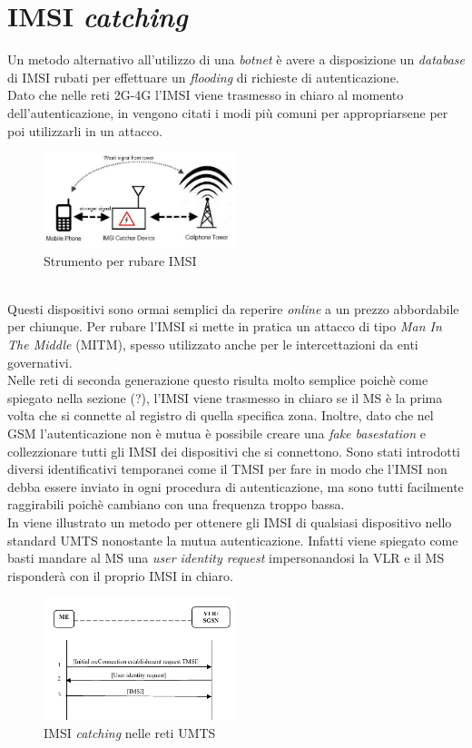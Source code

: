 \section{IMSI \textit{catching}}
Un metodo alternativo all'utilizzo di una \textit{botnet} è avere a disposizione un \textit{database} di IMSI rubati per effettuare un \textit{flooding} di richieste di autenticazione.\\
Dato che nelle reti 2G-4G l'IMSI viene trasmesso in chiaro al momento dell'autenticazione, in \cite{imsi-catcher} vengono citati i modi più comuni per appropriarsene per poi utilizzarli in un 
attacco.
\begin{figure}[h]
    \centering
    \includegraphics[width=0.5\textwidth]{images/imsi-catcher.jpg}
    \caption{Strumento per rubare IMSI}
\end{figure}\\
Questi dispositivi sono ormai semplici da reperire \textit{online} a un prezzo abbordabile per chiunque. Per rubare l'IMSI si mette in pratica un attacco di tipo \textit{Man In The Middle} (MITM), spesso utilizzato
anche per le intercettazioni da enti governativi.\\
Nelle reti di seconda generazione questo risulta molto semplice poichè come spiegato nella sezione (?), l'IMSI viene trasmesso in chiaro se il MS è la prima volta che si connette al registro di quella specifica
zona. Inoltre, dato che nel GSM l'autenticazione non è mutua è possibile creare una \textit{fake basestation} e collezzionare tutti gli IMSI dei dispositivi che si connettono.
Sono stati introdotti diversi identificativi temporanei come il TMSI per fare in modo che l'IMSI non debba essere inviato in ogni procedura di autenticazione, ma sono tutti facilmente raggirabili poichè cambiano con una
frequenza troppo bassa.\\
In \cite{dos-imsi} viene illustrato un metodo per ottenere gli IMSI di qualsiasi dispositivo nello standard UMTS nonostante la mutua autenticazione. Infatti viene spiegato come basti mandare al MS una \textit{user identity request} impersonandosi 
la VLR e il MS risponderà con il proprio IMSI in chiaro.
\begin{figure}[h]
    \centering
    \includegraphics[width=0.5\textwidth]{images/imsi-catch-umts.png}
    \caption{IMSI \textit{catching} nelle reti UMTS\cite{dos-imsi}}
\end{figure}\\

